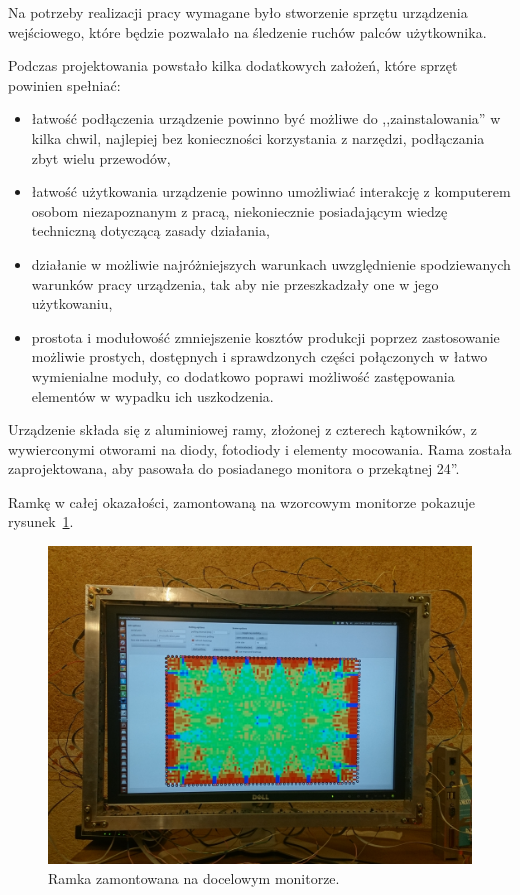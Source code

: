 \label{ch:hardware}

Na potrzeby realizacji pracy wymagane było stworzenie sprzętu \pauza urządzenia wejściowego, które będzie pozwalało na śledzenie ruchów palców użytkownika.

Podczas projektowania powstało kilka dodatkowych założeń, które sprzęt powinien spełniać:
\begin{itemize}
 \item łatwość podłączenia \pauza urządzenie powinno być możliwe do ,,zainstalowania'' w kilka chwil, najlepiej bez konieczności korzystania z narzędzi, podłączania zbyt wielu przewodów,
 \item łatwość użytkowania \pauza urządzenie powinno umożliwiać interakcję z komputerem osobom niezapoznanym z pracą, niekoniecznie posiadającym wiedzę techniczną dotyczącą zasady działania,
 \item działanie w możliwie najróżniejszych warunkach \pauza uwzględnienie spodziewanych warunków pracy urządzenia, tak aby nie przeszkadzały one w jego użytkowaniu,
 \item prostota i modułowość \pauza zmniejszenie kosztów produkcji poprzez zastosowanie możliwie prostych, dostępnych i sprawdzonych części połączonych w łatwo wymienialne moduły, co dodatkowo poprawi możliwość zastępowania elementów w wypadku ich uszkodzenia.\\
\end{itemize}

Urządzenie składa się z aluminiowej ramy, złożonej z czterech kątowników, z wywierconymi otworami na diody, fotodiody i elementy mocowania. Rama została zaprojektowana, aby pasowała do posiadanego monitora o przekątnej 24''.

Ramkę w całej okazałości, zamontowaną na wzorcowym monitorze pokazuje rysunek~\ref{fig:frame_full}.

\begin{figure}
  \myfloatalign
  \vspace{0.1\textheight}
  \includegraphics[width=\textwidth]{gfx/frame_full}
  \caption{Ramka zamontowana na docelowym monitorze.}
  \label{fig:frame_full}
\end{figure}

